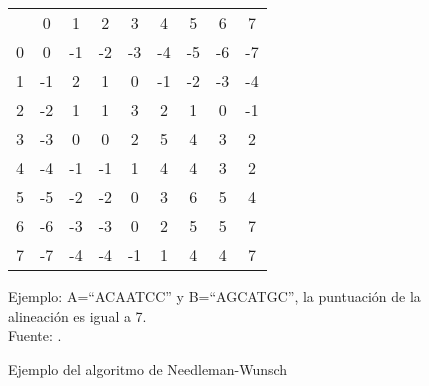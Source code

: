\begin{figure}[!h]
\centering
\begin{tabular}{ccccccccc}
                       & 0                       & 1                       & 2                       & 3                       & 4                       & 5                       & 6                       & 7                       \\ \cline{2-9}
\multicolumn{1}{c|}{0} & \multicolumn{1}{c|}{0}  & \multicolumn{1}{c|}{-1} & \multicolumn{1}{c|}{-2} & \multicolumn{1}{c|}{-3} & \multicolumn{1}{c|}{-4} & \multicolumn{1}{c|}{-5} & \multicolumn{1}{c|}{-6} & \multicolumn{1}{c|}{-7} \\ \cline{2-9}
\multicolumn{1}{c|}{1} & \multicolumn{1}{c|}{-1} & \multicolumn{1}{c|}{2}  & \multicolumn{1}{c|}{1}  & \multicolumn{1}{c|}{0}  & \multicolumn{1}{c|}{-1} & \multicolumn{1}{c|}{-2} & \multicolumn{1}{c|}{-3} & \multicolumn{1}{c|}{-4} \\ \cline{2-9}
\multicolumn{1}{c|}{2} & \multicolumn{1}{c|}{-2} & \multicolumn{1}{c|}{1}  & \multicolumn{1}{c|}{1}  & \multicolumn{1}{c|}{3}  & \multicolumn{1}{c|}{2}  & \multicolumn{1}{c|}{1}  & \multicolumn{1}{c|}{0}  & \multicolumn{1}{c|}{-1} \\ \cline{2-9}
\multicolumn{1}{c|}{3} & \multicolumn{1}{c|}{-3} & \multicolumn{1}{c|}{0}  & \multicolumn{1}{c|}{0}  & \multicolumn{1}{c|}{2}  & \multicolumn{1}{c|}{5}  & \multicolumn{1}{c|}{4}  & \multicolumn{1}{c|}{3}  & \multicolumn{1}{c|}{2}  \\ \cline{2-9}
\multicolumn{1}{c|}{4} & \multicolumn{1}{c|}{-4} & \multicolumn{1}{c|}{-1} & \multicolumn{1}{c|}{-1} & \multicolumn{1}{c|}{1}  & \multicolumn{1}{c|}{4}  & \multicolumn{1}{c|}{4}  & \multicolumn{1}{c|}{3}  & \multicolumn{1}{c|}{2}  \\ \cline{2-9}
\multicolumn{1}{c|}{5} & \multicolumn{1}{c|}{-5} & \multicolumn{1}{c|}{-2} & \multicolumn{1}{c|}{-2} & \multicolumn{1}{c|}{0}  & \multicolumn{1}{c|}{3}  & \multicolumn{1}{c|}{6}  & \multicolumn{1}{c|}{5}  & \multicolumn{1}{c|}{4}  \\ \cline{2-9}
\multicolumn{1}{c|}{6} & \multicolumn{1}{c|}{-6} & \multicolumn{1}{c|}{-3} & \multicolumn{1}{c|}{-3} & \multicolumn{1}{c|}{0}  & \multicolumn{1}{c|}{2}  & \multicolumn{1}{c|}{5}  & \multicolumn{1}{c|}{5}  & \multicolumn{1}{c|}{7}  \\ \cline{2-9}
\multicolumn{1}{c|}{7} & \multicolumn{1}{c|}{-7} & \multicolumn{1}{c|}{-4} & \multicolumn{1}{c|}{-4} & \multicolumn{1}{c|}{-1} & \multicolumn{1}{c|}{1}  & \multicolumn{1}{c|}{4}  & \multicolumn{1}{c|}{4}  & \multicolumn{1}{c|}{7}  \\ \cline{2-9}
\end{tabular}
\caption{Ejemplo del algoritmo de Needleman-Wunsch}
Ejemplo: A=``ACAATCC'' y B=``AGCATGC'', la puntuación de la alineación es igual a 7. \\Fuente: \cite{Halim2019}.
\label{tableNW}
\end{figure}
